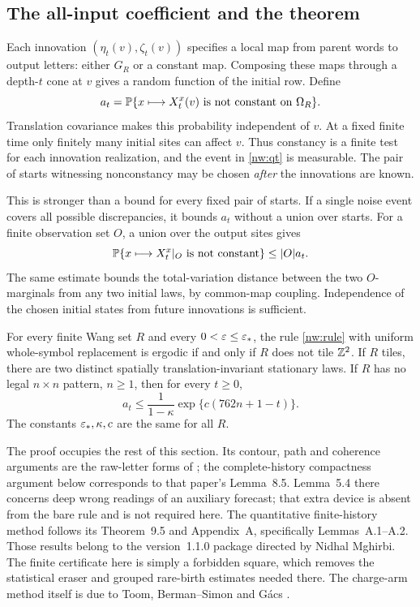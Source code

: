 \subsection{The all-input coefficient and the theorem}

Each innovation $(\eta_t(v),\zeta_t(v))$ specifies a local map from parent words to output letters: either $G_R$ or a constant map. Composing these maps through a depth-$t$ cone at $v$ gives a random function of the initial row. Define
\begin{equation}\label{nw:qt}
 a_t=\mathbb{P}\{x\longmapsto X_t^x(v)\text{ is not constant on }\Omega_R\}.
\end{equation}
Translation covariance makes this probability independent of $v$. At a fixed finite time only finitely many initial sites can affect $v$. Thus constancy is a finite test for each innovation realization, and the event in \eqref{nw:qt} is measurable. The pair of starts witnessing nonconstancy may be chosen \emph{after} the innovations are known.

This is stronger than a bound for every fixed pair of starts. If a single noise event covers all possible discrepancies, it bounds $a_t$ without a union over starts. For a finite observation set $O$, a union over the output sites gives
\begin{equation}\label{nw:window}
 \mathbb{P}\{x\longmapsto X_t^x|_O\text{ is not constant}\}\le |O|a_t.
\end{equation}
The same estimate bounds the total-variation distance between the two $O$-marginals from any two initial laws, by common-map coupling. Independence of the chosen initial states from future innovations is sufficient.

\begin{theorem}\label{nw:classification}
For every finite Wang set $R$ and every $0<\varepsilon\le\varepsilon_*$, the rule \eqref{nw:rule} with uniform whole-symbol replacement is ergodic if and only if $R$ does not tile $\mathbb{Z}^2$. If $R$ tiles, there are two distinct spatially translation-invariant stationary laws. If $R$ has no legal $n\times n$ pattern, $n\ge1$, then for every $t\ge0$,
\begin{equation}\label{nw:coalescence}
 a_t\le \frac{1}{1-\kappa}\exp\{c(762n+1-t)\}.
\end{equation}
The constants $\varepsilon_*,\kappa,c$ are the same for all $R$.
\end{theorem}

The proof occupies the rest of this section. Its contour, path and coherence arguments are the raw-letter forms of \cite[Lemmas~5.1--5.3]{DMdiagram}; the complete-history compactness argument below corresponds to that paper's Lemma~8.5. Lemma~5.4 there concerns deep wrong readings of an auxiliary forecast; that extra device is absent from the bare rule and is not required here. The quantitative finite-history method follows its Theorem~9.5 and Appendix~A, specifically Lemmas~A.1--A.2. Those results belong to the version~1.1.0 package directed by Nidhal Mghirbi. The finite certificate here is simply a forbidden square, which removes the statistical eraser and grouped rare-birth estimates needed there. The charge-arm method itself is due to Toom, Berman--Simon and G\'acs \cite{Toom80,BermanSimon88,Gacs21}.

